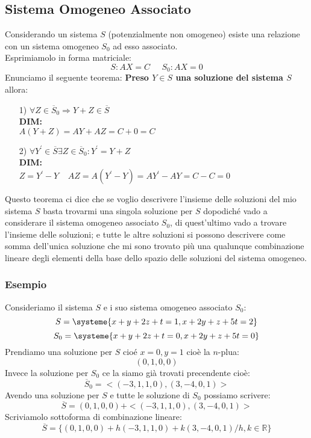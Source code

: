 \subsection{Sistema Omogeneo Associato}
Considerando un sistema $S$ (potenzialmente non omogeneo) esiste una relazione con un sistema omogeneo $S_0$ ad esso associato.\\
Esprimiamolo in forma matriciale:
$$ S: AX=C \;\;\;\;\; S_0: AX=0 $$
Enunciamo il seguente teorema: \textbf{Preso $Y \in S$ una soluzione del sistema $S$} allora:
\begin{itemize}
\item[1)] $\forall Z \in \overline{S}_0 \Rightarrow Y+Z \in \overline{S} $\\ \textbf{DIM:}\\
$A(Y+Z)= AY + AZ = C+0 = C$
\item[2)] $\forall Y^{\prime} \in \overline{S} \exists Z \in \overline{S}_0: Y^{\prime}=Y+Z$\\
\textbf{DIM:}\\
$Z=Y^{\prime}-Y \;\;\;\; AZ=A(Y^{\prime}-Y) = AY^{\prime}-AY = C-C = 0$
\end{itemize}

Questo teorema ci dice che se voglio descrivere l’insieme delle soluzioni del mio sistema $S$ basta trovarmi una singola soluzione per $S$ dopodiché vado a considerare il sistema omogeneo associato $S_0$, di quest’ultimo vado a trovare l’insieme delle soluzioni; e tutte le altre soluzioni si possono descrivere come somma dell’unica soluzione che mi sono trovato più una qualunque combinazione lineare degli elementi della base dello spazio delle soluzioni del sistema omogeneo.

\subsubsection{Esempio}
Consideriamo il sistema $S$ e i suo sistema omogeneo associato $S_0$:
$$
S=
\systeme
{
x+y+2z+t=1,
x+2y+z+5t=2
}
$$
$$
S_0=
\systeme
{
x+y+2z+t=0,
x+2y+z+5t=0
}
$$
Prendiamo una soluzione per $S$ cioé $x=0,y=1$ cioè la $n$-plua:
$$ (0,1,0,0) $$
Invece la soluzione per $S_0$ ce la siamo già trovati precendente cioè:
$$ \overline{S}_0 = <(-3,1,1,0),(3,-4,0,1)> $$
Avendo una soluzione per $S$ e tutte le soluzione di $S_0$ possiamo scrivere:
$$ \overline{S} = (0,1,0,0) + <(-3,1,1,0),(3,-4,0,1)> $$
Scriviamolo sottoforma di combinazione lineare:
$$ \overline{S} = \{(0,1,0,0) + h(-3,1,1,0)+k(3,-4,0,1)/h,k \in \mathbb{R}\} $$





